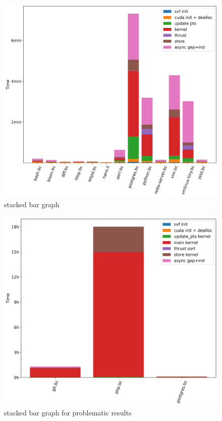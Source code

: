 \begin{figure}
    \centering
    \includegraphics[width=.9\textwidth]{img/stackedbar.png}
    \caption{stacked bar graph}
    \label{fig:stackedbar}
\end{figure}

\begin{figure}
    \centering
    \includegraphics[width=.9\textwidth]{img/stackedbar-problems.png}
    \caption{stacked bar graph for problematic results}
    \label{fig:stackedbar-problem}
\end{figure}

